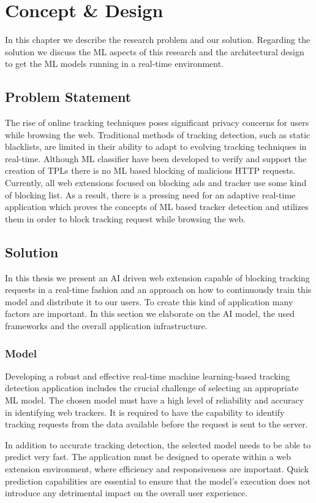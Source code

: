 \chapter{Concept \& Design}
In this chapter we describe the research problem and our solution. Regarding the solution we discuss 
the ML aspects of this research and the architectural design to get the ML models running in a real-time
environment.

\section{Problem Statement}
The rise of online tracking techniques poses significant privacy concerns for users while browsing the web.
Traditional methods of tracking detection, such as static blacklists, are limited in their ability to adapt
to evolving tracking techniques in real-time. Although ML classifier have been developed to verify and support
the creation of TPLs there is no ML based blocking of malicious HTTP requests. Currently, all web extensions focused on blocking
ads and tracker use some kind of blocking list. As a result, there is a pressing need for an adaptive real-time application which
proves the concepts of ML based tracker detection and utilizes them in order to block tracking request while browsing the web.
\section{Solution}
In this thesis we present an AI driven web extension capable of blocking tracking requests in a real-time fashion and an approach on how
to continuously train this model and distribute it to our users. To create this kind of application many factors are important. In this 
section we elaborate on the AI model, the used frameworks and the overall application infrastructure.
\subsection{Model}
Developing a robust and effective real-time machine learning-based tracking detection application includes the crucial challenge
of selecting an appropriate ML model. The chosen model must have a high level of reliability and accuracy in identifying web
trackers. It is required to have the capability to identify tracking requests from the data available before the request is sent
to the server.

In addition to accurate tracking detection, the selected model needs to be able to predict very fast.
The application must be designed to operate within a web extension environment, where efficiency and responsiveness are important.
Quick prediction capabilities are essential to ensure that the model's execution does not introduce any detrimental impact on
the overall user experience.

